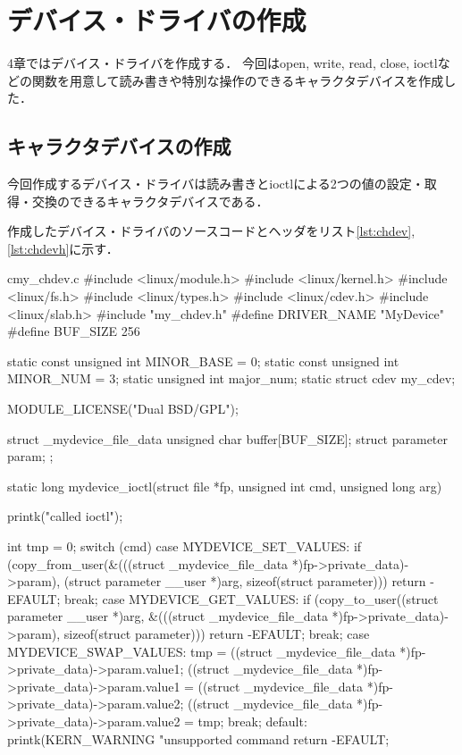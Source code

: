 \chapter{デバイス・ドライバの作成}
4章ではデバイス・ドライバを作成する．
今回はopen, write, read, close, ioctlなどの関数を用意して読み書きや特別な操作のできるキャラクタデバイスを作成した．

\section{キャラクタデバイスの作成}
今回作成するデバイス・ドライバは読み書きとioctlによる2つの値の設定・取得・交換のできるキャラクタデバイスである．

作成したデバイス・ドライバのソースコードとヘッダをリスト\ref{lst:chdev},\ref{lst:chdevh}に示す．
\begin{longlisting}
\begin{myminted}{c}{my_chdev.c}
#include <linux/module.h>
#include <linux/kernel.h>
#include <linux/fs.h>
#include <linux/types.h>
#include <linux/cdev.h>
#include <linux/slab.h>
#include "my_chdev.h"
#define DRIVER_NAME "MyDevice"
#define BUF_SIZE 256

static const unsigned int MINOR_BASE = 0;
static const unsigned int MINOR_NUM  = 3;
static unsigned int major_num;
static struct cdev my_cdev;

MODULE_LICENSE("Dual BSD/GPL");

struct _mydevice_file_data {
    unsigned char buffer[BUF_SIZE];
    struct parameter param;
};

static long mydevice_ioctl(struct file *fp, unsigned int cmd, unsigned long arg) {
    printk("called ioctl\n");

    int tmp = 0;
    switch (cmd) {
        case MYDEVICE_SET_VALUES:
            if (copy_from_user(&(((struct _mydevice_file_data *)fp->private_data)->param), (struct parameter __user *)arg, sizeof(struct parameter))) {
                return -EFAULT;
            }
            break;
        case MYDEVICE_GET_VALUES:
            if (copy_to_user((struct parameter __user *)arg, &(((struct _mydevice_file_data *)fp->private_data)->param), sizeof(struct parameter))) {
                return -EFAULT;
            }
            break;
        case MYDEVICE_SWAP_VALUES:
            tmp = ((struct _mydevice_file_data *)fp->private_data)->param.value1;
            ((struct _mydevice_file_data *)fp->private_data)->param.value1 = ((struct _mydevice_file_data *)fp->private_data)->param.value2;
            ((struct _mydevice_file_data *)fp->private_data)->param.value2 = tmp;
            break;
        default:
            printk(KERN_WARNING "unsupported command %
            return -EFAULT;
    }

}
\end{myminted}
\end{longlisting}
